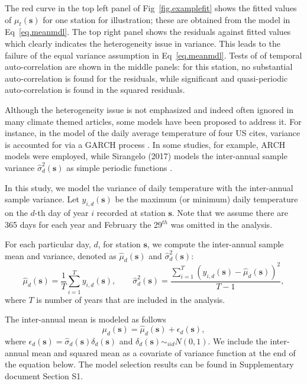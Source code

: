 \documentclass[fleqn,10pt]{wlscirep}
\newcommand{\bs}{\mathbf{s}}
\begin{document}
The red curve in the top left panel of Fig~\ref{fig.examplefit} shows the fitted values of $\mu_{t}(\bs)$ for one station for illustration; these are obtained from the model in Eq~\eqref{eq.meanmdl}. The top right panel shows the residuals against fitted values which clearly indicates the heterogeneity issue in variance. This leads to the failure of the equal variance assumption in Eq~\eqref{eq.meanmdl}. Tests of of temporal auto-correlation are shown in the middle panels: for this station, no substantial auto-correlation is found for the residuals, while significant and quasi-periodic auto-correlation is found in the squared residuals.

Although the heterogeneity issue is not emphasized and indeed often ignored in many climate themed articles, some models have been proposed to address it. For instance, in the model of the daily average temperature of four US cites, variance is accounted for via a GARCH process \cite{campbell2005weather}.
 In some studies, for example, ARCH models were employed\cite{benth2005stochastic,benth2007spatial,benth2007volatility}, while Sirangelo (2017) models the inter-annual sample variance $\hat{\sigma}_d^2(\bs)$ as simple periodic functions \cite{sirangelo2017stochastic}.


In this study, we model the variance of daily temperature with the inter-annual sample variance. Let $y_{i, d}(\bs)$ be the maximum (or minimum) daily temperature on the $d$-th day of year $i$ recorded at station $\bs$. Note that we assume there are 365 days for each year and February the 29$^{th}$ was omitted in the analysis.

For each particular day, $d$, for station $\bs$, we compute the inter-annual sample mean and variance, denoted as $\hat{\mu}_{d}(\bs)$ and $\hat{\sigma}_{d}^2(\bs)$:
\begin{equation}
\hat{\mu}_{d}(\bs) = \frac{1}{T}\sum_{i=1}^T y_{i,d}(\bs),\qquad \hat{\sigma}^2_{d}(\bs) = \frac{\sum_{i=1}^T (y_{i,d}(\bs)-\hat{\mu}_{d}(\bs))^2}{T-1},
\end{equation}
where $T$ is number of years that are included in the analysis.

The inter-annual mean is modeled as follows
\begin{equation}
	\mu_{d}(\bs) = \hat{\mu}_{d}(\bs) + \epsilon_{d}(\bs),
\end{equation}
where $\epsilon_{d}(\bs) = \hat{\sigma}_{d}(\bs) \delta_{d}(\bs)$ and $\delta_{d}(\bs)\sim_{iid} N(0,1)$.  We include the inter-annual mean and  squared mean as a covariate of variance function at the end of the equation below. The model selection results can be found in Supplementary document Section S1.
\end{document}
